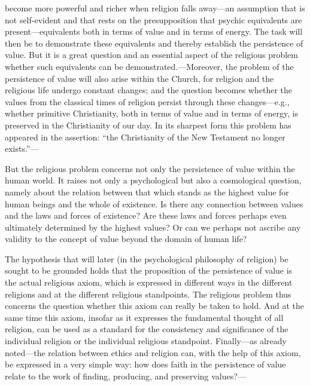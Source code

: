 \documentclass[12pt,a4paper]{book}
\newcommand{\opage}[1]{\marginnote{\footnotesize\textit{[#1]}}}
\begin{document}
become more powerful and richer when religion falls away---an assumption
that is not self-evident and that rests on the presupposition that
psychic equivalents are present---equivalents both in terms of value and
in terms of energy. The task will then be to demonstrate these
equivalents and thereby establish the persistence of value. But it is a
great question and an essential aspect of the religious problem whether
such equivalents can be demonstrated.---Moreover, the problem of the
persistence of value will also arise within the Church, for religion and
the religious life undergo constant changes; and the question becomes
whether the values from the classical times of religion persist through
these changes---e.g., whether primitive Christianity, both in terms of
value and in terms of energy, is preserved in the Christianity of our
day. In its sharpest form this problem has 
\opage{9}appeared in the assertion:
``the Christianity of the New Testament no longer exists.''---

But the religious problem concerns not only the persistence of value
within the human world. It raises not only a psychological but also a
cosmological question, namely about the relation between that which
stands as the highest value for human beings and the whole of existence.
Is there any connection between values and the laws and forces of
existence? Are these laws and forces perhaps even ultimately determined
by the highest values? Or can we perhaps not ascribe any validity to the
concept of value beyond the domain of human life?

The hypothesis that will later (in the psychological philosophy of
religion) be sought to be grounded holds that the proposition of the
persistence of value is the actual religious axiom, which is expressed
in different ways in the different religions and at the different
religious standpoints. The religious problem thus concerns the question
whether this axiom can really be taken to hold. And at the same time
this axiom, insofar as it expresses the fundamental thought of all
religion, can be used as a standard for the consistency and significance
of the individual religion or the individual religious standpoint.
Finally---as already noted---the relation between ethics and religion
can, with the help of this axiom, be expressed in a very simple way: how
does faith in the persistence of value relate to the work of finding,
producing, and preserving values?---
\end{document}
